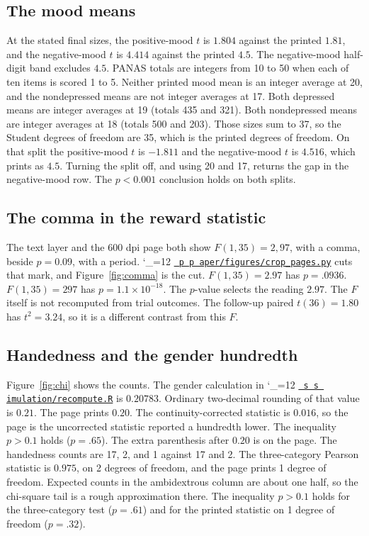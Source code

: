 \documentclass[11pt]{article}
\makeatletter
\def\ogm@show#1{%
  \ifx\relax#1\else
    #1\allowbreak
    \expandafter\ogm@show
  \fi}
\newcommand{\srcat}{\begingroup\catcode`\_=12 \ogm@srcat}
\newcommand{\ogm@srcat}[2]{%
  \edef\srcurl{https://github.com/alectionary/vibe-math/blob/master/formalization/overgeneral-memory/#1\#L#2}%
  \href{\srcurl}{\texttt{\ogm@show#1\relax}}\endgroup}
\makeatother
\begin{document}
\subsection{The mood means}
\label{sec:panas}

At the stated final sizes, the positive-mood \(t\) is \(1.804\) against the
printed \(1.81\), and the negative-mood \(t\) is \(4.414\) against the printed
\(4.5\).
The negative-mood half-digit band excludes \(4.5\).
PANAS totals are integers from 10 to 50 when each of ten items is scored 1
to 5.
Neither printed mood mean is an integer average at 20, and the nondepressed
means are not integer averages at 17.
Both depressed means are integer averages at 19 (totals 435 and 321).
Both nondepressed means are integer averages at 18 (totals 500 and 203).
Those sizes sum to 37, so the Student degrees of freedom are 35, which is
the printed degrees of freedom.
On that split the positive-mood \(t\) is \(-1.811\) and the negative-mood
\(t\) is \(4.516\), which prints as \(4.5\).
Turning the split off, and using 20 and 17, returns the gap in the
negative-mood row.
The \(p < 0.001\) conclusion holds on both splits.

\subsection{The comma in the reward statistic}
\label{sec:comma}

The text layer and the 600 dpi page both show \(F(1,35) = 2{,}97\), with a
comma, beside \(p = 0.09\), with a period.
\srcat{paper/figures/crop_pages.py}{66} cuts that mark, and
Figure~\ref{fig:comma} is the cut.
\(F(1,35) = 2.97\) has \(p = .0936\).
\(F(1,35) = 297\) has \(p = 1.1\times 10^{-18}\).
The \(p\)-value selects the reading \(2.97\).
The \(F\) itself is not recomputed from trial outcomes.
The follow-up paired \(t(36) = 1.80\) has \(t^2 = 3.24\), so it is a
different contrast from this \(F\).

\subsection{Handedness and the gender hundredth}
\label{sec:chi}

Figure~\ref{fig:chi} shows the counts.
The gender calculation in \srcat{simulation/recompute.R}{150} is \(0.20783\).
Ordinary two-decimal rounding of that value is \(0.21\).
The page prints \(0.20\).
The continuity-corrected statistic is \(0.016\), so the page is the
uncorrected statistic reported a hundredth lower.
The inequality \(p > 0.1\) holds (\(p = .65\)).
The extra parenthesis after \(0.20\) is on the page.
The handedness counts are 17, 2, and 1 against 17 and 2.
The three-category Pearson statistic is \(0.975\), on 2 degrees of freedom,
and the page prints 1 degree of freedom.
Expected counts in the ambidextrous column are about one half, so the
chi-square tail is a rough approximation there.
The inequality \(p > 0.1\) holds for the three-category test (\(p = .61\))
and for the printed statistic on 1 degree of freedom (\(p = .32\)).
\end{document}
